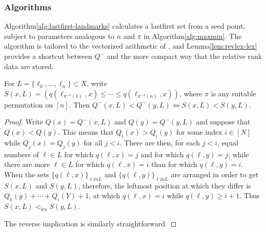 \documentclass{article}
\begin{document}
\hypertarget{algorithms}{%
\subsubsection{Algorithms}\label{algorithms}}

Algorithm\nbs\ref{alg:lastfirst-landmarks} calculates a lastfirst set
from a seed point, subject to parameters analogous to \(n\) and \(\varepsilon\)
in Algorithm\nbs\ref{alg:maxmin}. The algorithm is tailored to the
vectorized arithmetic of , and Lemma\nbs\ref{lem:revlex-lex}
provides a shortcut between \(Q^-\) and the more compact way that the
relative rank data are stored.

\begin{lemma}\label{lem:revlex-lex}
For $L = \{ \ell_0, \ldots, \ell_n \} \subset X$, write $S(x,L) = ( q(\ell_{\pi^{-1}(1)},x) \leq \cdots \leq q(\ell_{\pi^{-1}(n)},x) )$, where $\pi$ is any suitable permutation on $[n]$.
Then $Q^-(x,L) < Q^-(y,L) \Leftrightarrow S(x,L) < S(y,L)$.
\end{lemma}

\begin{proof}
Write $Q(x) = Q^-(x,L)$ and $Q(y) = Q^-(y,L)$ and suppose that $Q(x) < Q(y)$.
This means that $Q_i(x) > Q_i(y)$ for some index $i \in [N]$ while $Q_j(x) = Q_j(y)$ for all $j < i$.
There are then, for each $j < i$, equal numbers of $\ell \in L$ for which $q(\ell,x) = j$ and for which $q(\ell,y) = j$; while there are more $\ell \in L$ for which $q(\ell,x) = i$ than for which $q(\ell,y) = i$.
When the sets $\{ q(\ell,x) \}_{\ell in L}$ and $\{ q(\ell,y) \}_{\ell in L}$ are arranged in order to get $S(x,L)$ and $S(y,L)$, therefore, the leftmost position at which they differ is $Q_1(y) + \cdots + Q_i(Y) + 1$, at which $q(\ell,x) = i$ while $q(\ell,y) \geq i + 1$.
Thus $S(x,L) <_{\operatorname{lex}} S(y,L)$.

The reverse implication is similarly straightforward.
\end{proof}
\end{document}
